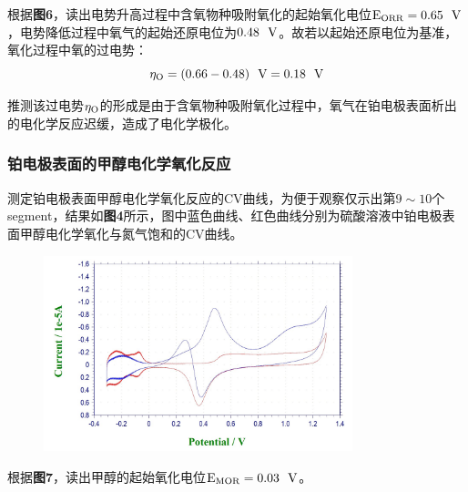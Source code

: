 \documentclass[12pt]{article}
\begin{document}
			\par
			根据\textbf{图6}，读出电势升高过程中含氧物种吸附氧化的起始氧化电位$\rm{E_{ORR}}=0.65\ \ {\rm V}$，电势降低过程中氧气的起始还原电位为$0.48\ \ {\rm V}$。故若以起始还原电位为基准，氧化过程中氧的过电势：
			$$
			\eta_{\rm O}=(0.66-0.48)\ \ {\rm V}=0.18\ \ {\rm V}
			$$
			\par
			推测该过电势$\eta_{\rm O}$的形成是由于含氧物种吸附氧化过程中，氧气在铂电极表面析出的电化学反应迟缓，造成了电化学极化。\par
			
			\subsubsection{铂电极表面的甲醇电化学氧化反应}
			测定铂电极表面甲醇电化学氧化反应的CV曲线，为便于观察仅示出第$9\sim 10$个segment，结果如\textbf{图4}所示，图中蓝色曲线、红色曲线分别为硫酸溶液中铂电极表面甲醇电化学氧化与氮气饱和的CV曲线。
			\begin{figure}[h]
				\centering
				\includegraphics[width=0.8\textwidth]{7.png}
			\end{figure}
			\par
			根据\textbf{图7}，读出甲醇的起始氧化电位$\rm{E_{MOR}}= 0.03\ \ {\rm V}$。
\end{document}

